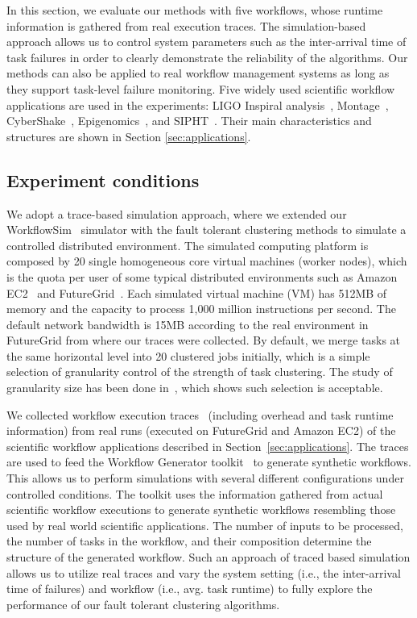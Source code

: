 In this section, we evaluate our methods with five workflows, whose runtime information is gathered from real execution traces. The simulation-based approach allows us to control system parameters such as the inter-arrival time of task failures in order to clearly demonstrate the reliability of the algorithms. Our methods can also be applied to real workflow management systems as long as they support task-level failure monitoring. 
Five widely used scientific workflow applications are used in the experiments: LIGO Inspiral analysis~\cite{LIGO}, Montage~\cite{Berriman2004}, CyberShake~\cite{Graves2010}, Epigenomics~\cite{Epigenome}, and SIPHT~\cite{SIPHT}. Their main characteristics and structures are shown in Section \ref{sec:applications}. 




\subsection{Experiment conditions}
\label{sec:tolerance:experiment_conditions}
We adopt a trace-based simulation approach, where we extended our WorkflowSim~\cite{WorkflowSim} simulator with the fault tolerant clustering methods to simulate a controlled distributed environment. 
The simulated computing platform is composed by 20 single homogeneous core virtual machines (worker nodes), which is the quota per user of some typical distributed environments such as Amazon EC2~\cite{AmazonAWS} and FutureGrid~\cite{Fox2013FutureGrid}. Each simulated virtual machine (VM) has 512MB of memory and the capacity to process 1,000 million instructions per second. The default network bandwidth is 15MB according to the real environment in FutureGrid from where our traces were collected. By default, we merge tasks at the same horizontal level into 20 clustered jobs initially, which is a simple selection of granularity control of the strength of task clustering. The study of granularity size has been done in~\cite{Chen2013b}, which shows such selection is acceptable.

We collected workflow execution traces~\cite{Juve2013, Chen2011} (including overhead and task runtime information) from real runs (executed on FutureGrid and Amazon EC2) of the scientific workflow applications described in Section~\ref{sec:applications}. The traces are used to feed the Workflow Generator toolkit~\cite{WorkflowGenerator} to generate synthetic workflows. This allows us to perform simulations with several different configurations under controlled conditions. The toolkit uses the information gathered from actual scientific workflow executions to generate synthetic workflows resembling those used by real world scientific applications. The number of inputs to be processed, the number of tasks in the workflow, and their composition determine the structure of the generated workflow. Such an approach of traced based simulation allows us to utilize real traces and vary the system setting (i.e., the inter-arrival time of failures) and workflow (i.e., avg. task runtime) to fully explore the performance of our fault tolerant clustering algorithms. 

